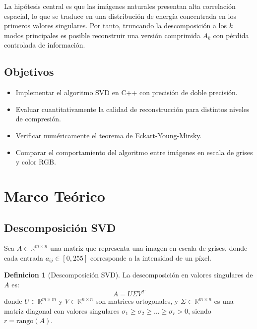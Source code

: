 ﻿\documentclass[12pt,a4paper]{article}
\theoremstyle{definition}
\newtheorem{definition}{Definicion}[section]
\newcommand{\R}{\mathbb{R}}
\begin{document}
La hip\'{o}tesis central es que las im\'{a}genes naturales presentan alta correlaci\'{o}n espacial, lo que se traduce en una distribuci\'{o}n de energ\'{i}a concentrada en los primeros valores singulares. Por tanto, truncando la descomposici\'{o}n a los $k$ modos principales es posible reconstruir una versi\'{o}n comprimida $A_k$ con p\'{e}rdida controlada de informaci\'{o}n.

\subsection{Objetivos}
\begin{itemize}
    \item Implementar el algoritmo SVD en C++ con precisi\'{o}n de doble precisi\'{o}n.
    \item Evaluar cuantitativamente la calidad de reconstrucci\'{o}n para distintos niveles de compresi\'{o}n.
    \item Verificar num\'{e}ricamente el teorema de Eckart-Young-Mirsky.
    \item Comparar el comportamiento del algoritmo entre im\'{a}genes en escala de grises y color RGB.
\end{itemize}

\section{Marco Te\'{o}rico}\label{sec:teoria}

\subsection{Descomposici\'{o}n SVD}

Sea $A \in \R^{m \times n}$ una matriz que representa una imagen en escala de grises, donde cada entrada $a_{ij} \in [0, 255]$ corresponde a la intensidad de un p\'{i}xel.

\begin{definition}[Descomposici\'{o}n SVD]
La descomposici\'{o}n en valores singulares de $A$ es:
\begin{equation}\label{eq:svd}
A = U \Sigma V^T
\end{equation}
donde $U \in \R^{m \times m}$ y $V \in \R^{n \times n}$ son matrices ortogonales, y $\Sigma \in \R^{m \times n}$ es una matriz diagonal con valores singulares $\sigma_1 \geq \sigma_2 \geq \dots \geq \sigma_r > 0$, siendo $r = \text{rango}(A)$.
\end{definition}
\end{document}
